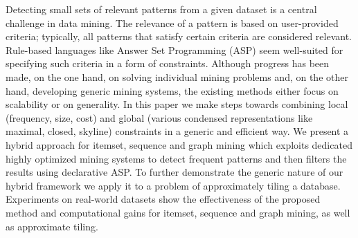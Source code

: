   Detecting small sets of relevant patterns from a given dataset is a central challenge in data mining. The relevance of a pattern is based on user-provided criteria; typically, all patterns that satisfy certain criteria are considered relevant. Rule-based languages like Answer Set Programming (ASP) seem well-suited for specifying such criteria in a form of constraints.  Although progress has been made, on the one hand, on solving individual mining problems and, on the other hand, developing generic mining systems, the existing methods either focus on scalability or on generality.  In this paper we make steps towards combining local (frequency, size, cost) and global (various condensed representations like maximal, closed, skyline) constraints in a generic and efficient way. We present a hybrid approach for itemset, sequence and graph mining which exploits dedicated highly optimized mining systems to detect frequent patterns and then filters the results using declarative ASP. To further demonstrate the generic nature of our hybrid framework we apply it to a problem of approximately tiling a database. Experiments on real-world datasets show the effectiveness of the proposed method and computational gains 
for itemset, sequence and graph mining, as well as approximate tiling. 
